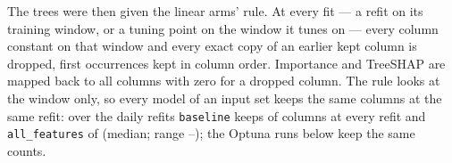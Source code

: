 The trees were then given the linear arms' rule. At every fit --- a refit on
its training window, or a tuning point on the window it tunes on --- every column constant on
that window and every exact copy of an earlier kept column is dropped, first occurrences
kept in column order. Importance and TreeSHAP are mapped back to all columns with zero for a dropped
column. The rule looks at the window only, so every model of an input set keeps the same
columns at the same refit: over the \campKeptRefits{} daily refits \texttt{baseline} keeps
\campKeptBase{} of \campPBase{} columns at every refit and
\texttt{all\_features} \campKeptAll{} of \campPAll{} (median; range
\campKeptAllLo--\campKeptAllHi); the
Optuna runs below keep the same counts.

